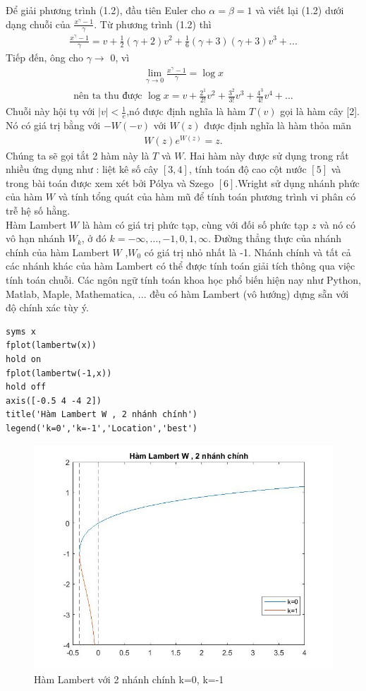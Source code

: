 	Để giải phương trình (1.2), đầu tiên Euler cho $\alpha = \beta = 1$ và viết lại (1.2) dưới dạng chuỗi của $\frac{x^{\gamma}-1}{\gamma}$. Từ phương trình (1.2) thì 
		\begin{align*}
			\frac{x^{\gamma}-1}{\gamma} = v + \frac{1}{2}(\gamma+2)v^{2} + \frac{1}{6}(\gamma+3)(\gamma+3)v^{3} + ... 
		\end{align*}
		Tiếp đến, ông cho $\gamma \rightarrow$ 0, vì \begin{align*} \displaystyle \lim_{\gamma \to 0}\frac{x^{\gamma}-1}{\gamma} = \log x 
		\end{align*}
		\begin{align} \mbox{nên ta thu được }\log x = v + \frac{2^{1}}{2!}v^{2} + \frac{3^{2}}{3!}v^{3} + \frac{4^3}{4!}v^{4} + ... 
		\end{align}
		Chuỗi này hội tụ với $|v| < \frac{1}{e}$,nó được định nghĩa là hàm $T(v)$ gọi là hàm cây [2]. Nó có giá trị bằng với $-W(-v)$ với $W(z)$ được định nghĩa là hàm thỏa mãn 
		\begin{align}
			W(z)e^{W(z)} = z.
		\end{align} 
		Chúng ta sẽ gọi tắt 2 hàm này là $T$ và $W$. Hai hàm này được sử dụng trong rất nhiều ứng dụng như : liệt kê số cây $[3,4]$, tính toán độ cao cột nước $[5]$ và trong bài toán được xem xét bởi Pólya và Szego $[6]$.Wright sử dụng nhánh phức của hàm $W$ và tính tổng quát của hàm mũ để tính toán phương trình vi phân có trễ hệ số hằng.\\
		Hàm Lambert $W$ là hàm có giá trị phức tạp, cùng với đối số phức tạp $z$ và nó có vô hạn nhánh $W_{k}$, ở đó $k = -\infty, ..., -1, 0 , 1, \infty$. Đường thẳng thực của nhánh chính của hàm Lambert $W$ ,$W_{0}$ có giá trị nhỏ nhất là -1. Nhánh chính và tất cả các nhánh khác của hàm Lambert có thể được tính toán giải tích thông qua việc tính toán chuỗi. Các ngôn ngữ tính toán khoa học phổ biến hiện nay như Python, Matlab, Maple, Mathematica, ... đều có hàm Lambert (vô hướng) dựng sẵn với độ chính xác tùy ý.
\begin{verbatim}
syms x
fplot(lambertw(x))
hold on
fplot(lambertw(-1,x))
hold off
axis([-0.5 4 -4 2])
title('Hàm Lambert W , 2 nhánh chính')
legend('k=0','k=-1','Location','best')
\end{verbatim}
\begin{figure}
	\centering
    \includegraphics[scale=0.5]{MATLAB_files/wfig.jpg}
    \caption{Hàm Lambert với 2 nhánh chính k=0, k=-1}
\end{figure}

